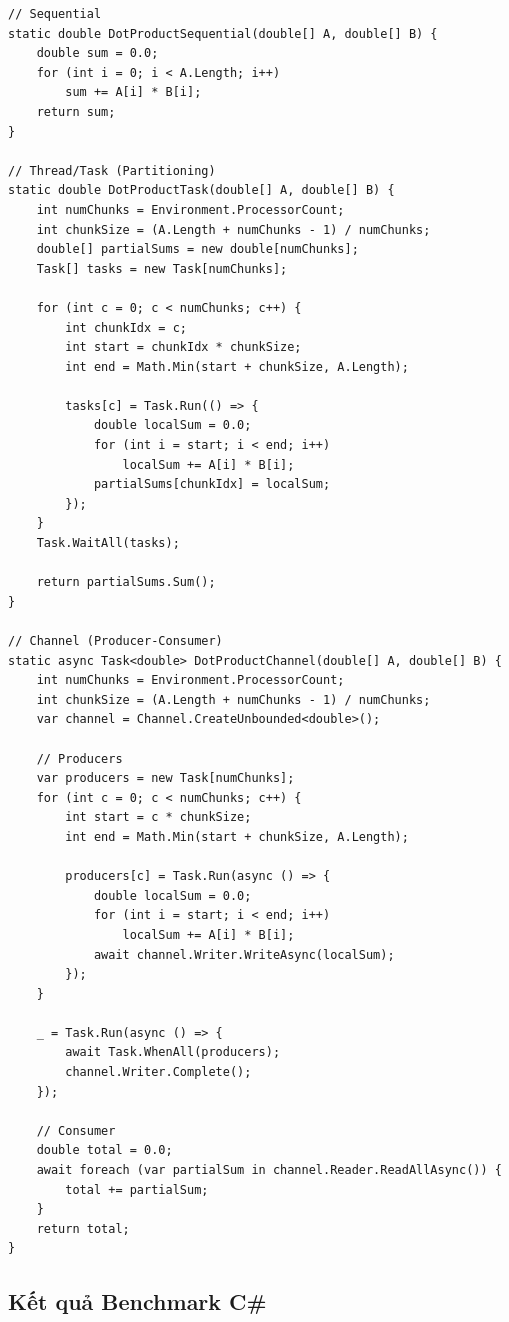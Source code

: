 \begin{lstlisting}[style=csharpstyle, caption={Dot Product với C\# Task/Channel}, label={lst:dotproduct_csharp}]
// Sequential
static double DotProductSequential(double[] A, double[] B) {
    double sum = 0.0;
    for (int i = 0; i < A.Length; i++)
        sum += A[i] * B[i];
    return sum;
}

// Thread/Task (Partitioning)
static double DotProductTask(double[] A, double[] B) {
    int numChunks = Environment.ProcessorCount;
    int chunkSize = (A.Length + numChunks - 1) / numChunks;
    double[] partialSums = new double[numChunks];
    Task[] tasks = new Task[numChunks];

    for (int c = 0; c < numChunks; c++) {
        int chunkIdx = c;
        int start = chunkIdx * chunkSize;
        int end = Math.Min(start + chunkSize, A.Length);

        tasks[c] = Task.Run(() => {
            double localSum = 0.0;
            for (int i = start; i < end; i++)
                localSum += A[i] * B[i];
            partialSums[chunkIdx] = localSum;
        });
    }
    Task.WaitAll(tasks);

    return partialSums.Sum();
}

// Channel (Producer-Consumer)
static async Task<double> DotProductChannel(double[] A, double[] B) {
    int numChunks = Environment.ProcessorCount;
    int chunkSize = (A.Length + numChunks - 1) / numChunks;
    var channel = Channel.CreateUnbounded<double>();

    // Producers
    var producers = new Task[numChunks];
    for (int c = 0; c < numChunks; c++) {
        int start = c * chunkSize;
        int end = Math.Min(start + chunkSize, A.Length);

        producers[c] = Task.Run(async () => {
            double localSum = 0.0;
            for (int i = start; i < end; i++)
                localSum += A[i] * B[i];
            await channel.Writer.WriteAsync(localSum);
        });
    }

    _ = Task.Run(async () => {
        await Task.WhenAll(producers);
        channel.Writer.Complete();
    });

    // Consumer
    double total = 0.0;
    await foreach (var partialSum in channel.Reader.ReadAllAsync()) {
        total += partialSum;
    }
    return total;
}
\end{lstlisting}

\subsection{Kết quả Benchmark C\#}

